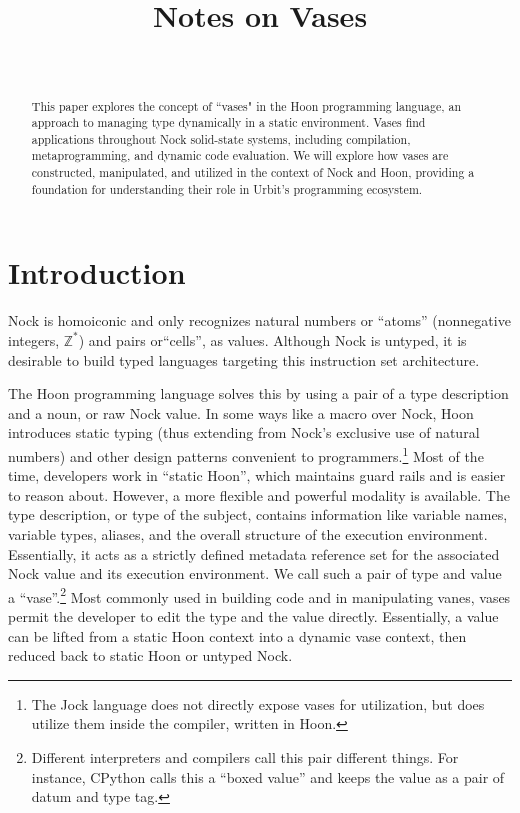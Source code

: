 \documentclass[twoside]{article}
\title{Notes on Vases}
\author{\authorname~\authorpatp \\ \affiliation}
\date{}
\begin{document}
\maketitle
\thispagestyle{firststyle}

\begin{abstract}
  This paper explores the concept of ``vases" in the Hoon programming language, an approach to managing type dynamically in a static environment.  Vases find applications throughout Nock solid-state systems, including compilation, metaprogramming, and dynamic code evaluation.  We will explore how vases are constructed, manipulated, and utilized in the context of Nock and Hoon, providing a foundation for understanding their role in Urbit's programming ecosystem.
\end{abstract}

\setcounter{page}{131}

\tableofcontents

\section{Introduction}

\sloppy
Nock is homoiconic and only recognizes natural numbers or ``atoms'' (nonnegative integers, $\mathbb{Z}^{*}$) and pairs or``cells'', as values. Although Nock is untyped, it is desirable to build typed languages targeting this instruction set architecture.

The Hoon programming language solves this by using a pair of a type description and a noun, or raw Nock value.  In some ways like a macro over Nock, Hoon introduces static typing (thus extending from Nock's exclusive use of natural numbers) and other design patterns convenient to programmers.\footnote{The Jock language does not directly expose vases for utilization, but does utilize them inside the compiler, written in Hoon.}  Most of the time, developers work in “static Hoon”, which maintains guard rails and is easier to reason about.  However, a more flexible and powerful modality is available.  The type description, or type of the subject, contains information like variable names, variable types, aliases, and the overall structure of the execution environment.  Essentially, it acts as a strictly defined metadata reference set for the associated Nock value and its execution environment.  We call such a pair of type and value a “vase”.\footnote{Different interpreters and compilers call this pair different things.  For instance, CPython calls this a “boxed value” and keeps the value as a pair of datum and type tag.}  Most commonly used in building code and in manipulating vanes, vases permit the developer to edit the type and the value directly.  Essentially, a value can be lifted from a static Hoon context into a dynamic vase context, then reduced back to static Hoon or untyped Nock.
\end{document}
